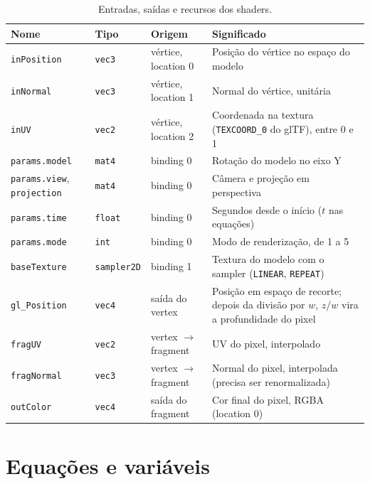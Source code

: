 \begin{table}[H]
\centering
\caption{Entradas, saídas e recursos dos shaders.}
\label{tab:shader-io}
\small
\begin{tabular}{>{\raggedright\arraybackslash}p{3.0cm}>{\raggedright\arraybackslash}p{1.9cm}>{\raggedright\arraybackslash}p{2.5cm}>{\raggedright\arraybackslash}p{6.4cm}}
\toprule
\textbf{Nome} & \textbf{Tipo} & \textbf{Origem} & \textbf{Significado} \\
\midrule
\texttt{inPosition} & \texttt{vec3} & vértice, location 0 & Posição do vértice no espaço do modelo \\
\texttt{inNormal} & \texttt{vec3} & vértice, location 1 & Normal do vértice, unitária \\
\texttt{inUV} & \texttt{vec2} & vértice, location 2 & Coordenada na textura (\texttt{TEXCOORD\_0} do glTF), entre 0 e 1 \\
\texttt{params.model} & \texttt{mat4} & binding 0 & Rotação do modelo no eixo Y \\
\texttt{params.view}, \texttt{projection} & \texttt{mat4} & binding 0 & Câmera e projeção em perspectiva \\
\texttt{params.time} & \texttt{float} & binding 0 & Segundos desde o início (\(t\) nas equações) \\
\texttt{params.mode} & \texttt{int} & binding 0 & Modo de renderização, de 1 a 5 \\
\texttt{baseTexture} & \texttt{sampler2D} & binding 1 & Textura do modelo com o sampler (\texttt{LINEAR}, \texttt{REPEAT}) \\
\texttt{gl\_Position} & \texttt{vec4} & saída do vertex & Posição em espaço de recorte; depois da divisão por \(w\), \(z/w\) vira a profundidade do pixel \\
\texttt{fragUV} & \texttt{vec2} & vertex \(\rightarrow\) fragment & UV do pixel, interpolado \\
\texttt{fragNormal} & \texttt{vec3} & vertex \(\rightarrow\) fragment & Normal do pixel, interpolada (precisa ser renormalizada) \\
\texttt{outColor} & \texttt{vec4} & saída do fragment & Cor final do pixel, RGBA (location 0) \\
\bottomrule
\end{tabular}
\end{table}

\section{Equações e variáveis}

